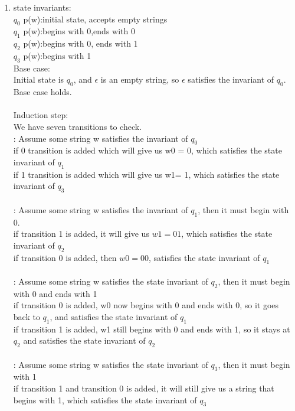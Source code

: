 \documentclass[12pt]{article}
\begin{document}
\begin{enumerate}
\item
state invariants:\\
$q_0$ p(w):initial state, accepts empty strings\\
$q_1$ p(w):begins with 0,ends with 0\\
$q_2$ p(w):begins with 0, ends with 1\\
$q_3$ p(w):begins with 1\\

Base case:\\
Initial state is $q_0$, and $\epsilon$ is an empty string, so $\epsilon$ satisfies the invariant of $q_0$.\\
Base case holds.\\\\
Induction step: \\
We have seven transitions to check.\\
\uppercase\expandafter{}: Assume some string w satisfies the invariant of $q_0$\\
if 0 transition is added which will give us w0 = 0, which satisfies the state invariant of $q_1$\\
if 1 transition is added which will give us w1= 1, which satisfies the state invariant of $q_3$\\\\
\uppercase\expandafter{}: Assume some string w satisfies the invariant of $q_1$, then it must begin with 0.\\
if transition 1 is added, it will give us $w1 = 01$, which satisfies the state invariant of $q_2$\\
if transition 0 is added, then $w0 = 00$, satisfies the state invariant of $q_1$\\\\
\uppercase\expandafter{}: Assume some string w satisfies the state invariant of $q_2$, then it must begin with 0 and ends with 1\\
if transition 0 is added, w0 now begins with 0 and ends with 0, so it goes back to $q_1$, and satisfies the state invariant of $q_1$\\
if transition 1 is added, w1 still begins with 0 and ends with 1, so it stays at $q_2$ and satisfies the state invariant of $q_2$\\\\
\uppercase\expandafter{}: Assume some string w satisfies the state invariant of $q_3$, then it must begin with 1\\
if transition 1 and transition 0 is added, it will still give us a string that begins with 1, which satisfies the state invariant of $q_3$\\


\end{enumerate}
\end{document}
